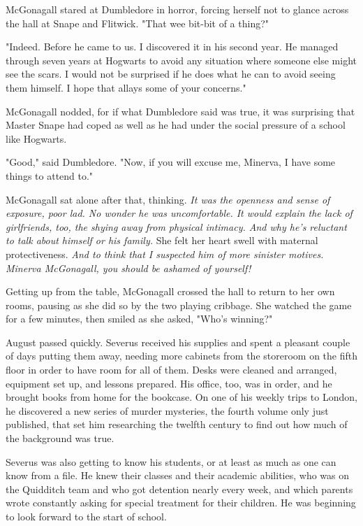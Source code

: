 McGonagall stared at Dumbledore in horror, forcing herself not to glance across the hall at Snape and Flitwick. "That wee bit-bit of a thing?"

"Indeed. Before he came to us. I discovered it in his second year. He managed through seven years at Hogwarts to avoid any situation where someone else might see the scars. I would not be surprised if he does what he can to avoid seeing them himself. I hope that allays some of your concerns."

McGonagall nodded, for if what Dumbledore said was true, it was surprising that Master Snape had coped as well as he had under the social pressure of a school like Hogwarts.

"Good," said Dumbledore. "Now, if you will excuse me, Minerva, I have some things to attend to."

McGonagall sat alone after that, thinking. \emph{It was the openness and sense of exposure, poor lad. No wonder he was uncomfortable. It would explain the lack of girlfriends, too, the shying away from physical intimacy. And why he's reluctant to talk about himself or his family.} She felt her heart swell with maternal protectiveness. \emph{And to think that I suspected him of more sinister motives. Minerva McGonagall, you should be ashamed of yourself!}

Getting up from the table, McGonagall crossed the hall to return to her own rooms, pausing as she did so by the two playing cribbage. She watched the game for a few minutes, then smiled as she asked, "Who's winning?"

August passed quickly. Severus received his supplies and spent a pleasant couple of days putting them away, needing more cabinets from the storeroom on the fifth floor in order to have room for all of them. Desks were cleaned and arranged, equipment set up, and lessons prepared. His office, too, was in order, and he brought books from home for the bookcase. On one of his weekly trips to London, he discovered a new series of murder mysteries, the fourth volume only just published, that set him researching the twelfth century to find out how much of the background was true.

Severus was also getting to know his students, or at least as much as one can know from a file. He knew their classes and their academic abilities, who was on the Quidditch team and who got detention nearly every week, and which parents wrote constantly asking for special treatment for their children. He was beginning to look forward to the start of school.

